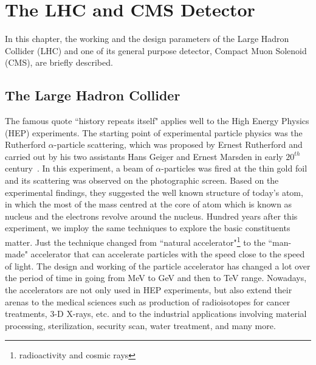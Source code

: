 \chapter{The LHC and CMS Detector} %
\label{cha:the_lhc_and_cms_machine}

In this chapter, the working and the design parameters of the Large Hadron Collider (LHC) and one of its general purpose detector, Compact Muon Solenoid (CMS), are briefly described.


\section{The Large Hadron Collider} %
\label{sec:the_large_hadron_collider}

The famous quote ``history repeats itself" applies well to the High Energy Physics (HEP) experiments. The starting point of experimental particle physics was the Rutherford $\alpha$-particle scattering, which was proposed by Ernest Rutherford and carried out by his two assistants  Hans Geiger and Ernest Marsden in early $20^{th}$ century~\cite{Hauptman2010}. In this experiment, a beam of $\alpha$-particles was fired at the thin gold foil and its scattering was observed on the photographic screen. Based on the experimental findings, they suggested the well known structure of today's atom, in which the most of the mass centred at the core of atom which is known as nucleus and the electrons  revolve around the nucleus. Hundred years after this experiment, we imploy the same techniques to explore the basic constituents matter. Just the technique changed from ``natural accelerator"\footnote{radioactivity and cosmic rays} to the ``man-made" accelerator that can accelerate particles with the speed close to the speed of light. The design and working of the particle accelerator has changed a lot over the period of time in going from MeV to GeV and then to TeV range. Nowadays, the accelerators are not only used in HEP experiments, but also extend their arenas to the medical sciences such as production of radioisotopes for cancer treatments, 3-D X-rays, etc. and to the industrial applications involving material processing, sterilization, security scan, water treatment, and many more. 

